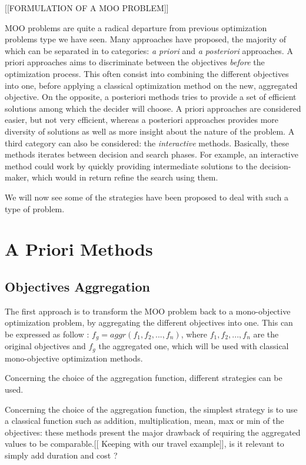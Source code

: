 [[FORMULATION OF A MOO PROBLEM]]

MOO problems are quite a radical departure from previous optimization problems type we have seen. Many approaches have proposed, the majority of which can be separated in to categories: \emph{a priori} and \emph{a posteriori} approaches. A priori approaches aims to discriminate between the objectives \emph{before} the optimization process. This often consist into combining the different objectives into one, before applying a classical optimization method on the new, aggregated objective.
On the opposite, a posteriori methods tries to provide a set of efficient solutions among which the decider will choose.
A priori approaches are considered easier, but not very efficient, whereas a posteriori approaches provides more diversity of solutions as well as more insight about the nature of the problem.
A third category can also be considered: the \emph{interactive} methods. Basically, these methods iterates between decision and search phases. For example, an interactive  method could work by quickly providing intermediate solutions to the decision-maker, which would in return refine the search using them.

We will now see some of the strategies have been proposed to deal with such a type of problem.

\section{A Priori Methods}

\subsection{Objectives Aggregation}

The first approach is to transform the MOO problem back to a mono-objective optimization problem, by aggregating the different objectives into one. This can be expressed as follow : \(f_g = aggr(f_1, f_2, ..., f_n)\), where \(f_1, f_2, ..., f_n\) are the original objectives and \(f_g\) the aggregated one, which will be used with classical mono-objective optimization methods.

Concerning the choice of the aggregation function, different strategies can be used.

Concerning the choice of the aggregation function, the simplest strategy is to use a classical function such as addition, multiplication, mean, max or min of the objectives: these methods present the major drawback of requiring the aggregated values to be comparable.[[ Keeping with our travel example]], is it relevant to simply add duration and cost ?

